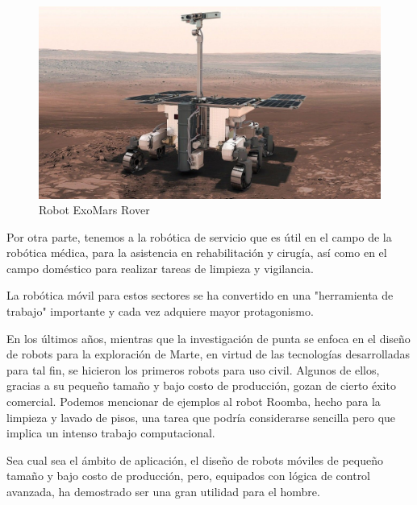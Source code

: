 \begin{figure}[H]
    \centering
    \includegraphics[width=0.5\linewidth]{images/Exomars_Rover.jpg}
    \caption{Robot ExoMars Rover}
    \label{fig:robot_exomarsrover}
\end{figure}

Por otra parte, tenemos a la robótica de servicio que es útil en el campo de la robótica médica, para la asistencia en rehabilitación y cirugía, así como en el campo doméstico para realizar tareas de limpieza y vigilancia.

La robótica móvil para estos sectores se ha convertido en una "herramienta de trabajo" importante y cada vez adquiere mayor protagonismo.

En los últimos años, mientras que la investigación de punta se enfoca en el diseño de robots para la exploración de Marte, en virtud de las tecnologías desarrolladas para tal fin, se hicieron los primeros robots para uso civil. Algunos de ellos, gracias a su pequeño tamaño y bajo costo de producción, gozan de cierto éxito comercial. Podemos mencionar de ejemplos al robot Roomba, hecho para la limpieza y lavado de pisos, una tarea que podría considerarse sencilla pero que implica un intenso trabajo computacional.

Sea cual sea el ámbito de aplicación, el diseño de robots móviles de pequeño tamaño y bajo costo de producción, pero, equipados con lógica de control avanzada, ha demostrado ser una gran utilidad para el hombre.